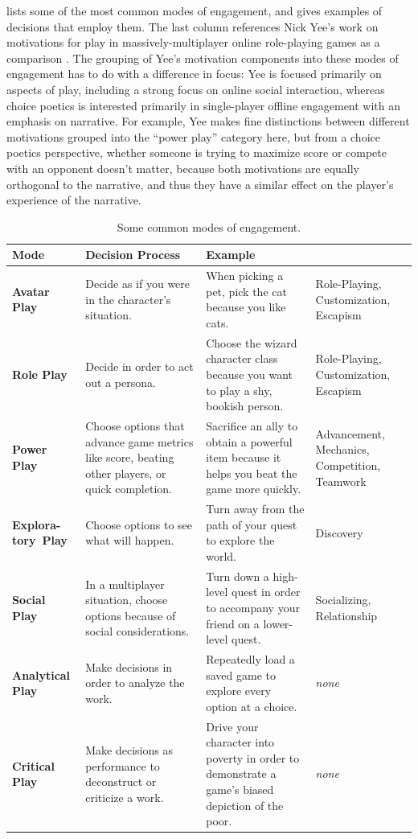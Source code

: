  lists some of the most common modes of engagement, and gives examples of decisions that employ them.
%
The last column references Nick Yee's work on motivations for play in massively-multiplayer online role-playing games as a comparison \citep{Yee2006}.
%
The grouping of Yee's motivation components into these modes of engagement has to do with a difference in focus: Yee is focused primarily on aspects of play, including a strong focus on online social interaction, whereas choice poetics is interested primarily in single-player offline engagement with an emphasis on narrative.
%
For example, Yee makes fine distinctions between different motivations grouped into the ``power play'' category here, but from a choice poetics perspective, whether someone is trying to maximize score or compete with an opponent doesn't matter, because both motivations are equally orthogonal to the narrative, and thus they have a similar effect on the player's experience of the narrative.


\begin{table}[!p]
\begingroup
\renewcommand*{\arraystretch}{1.5}
\begin{tabular}{>{\raggedright}p{5.5em}>{\raggedright}p{10em}>{\raggedright}p{9.8em}>{\raggedright}p{6.6em}}
\toprule
\textbf{Mode} & \textbf{Decision Process} & \textbf{Example} & \textbf{\citep{Yee2006}} \tabularnewline
\midrule
\textbf{Avatar Play}%
& Decide as if you were in the character's situation.%
& When picking a pet, pick the cat because you like cats.%
& Role-Playing, Customization, Escapism \tabularnewline
\textbf{Role Play}
& Decide in order to act out a persona.
& Choose the wizard character class because you want to play a shy, bookish person.
& Role-Playing, Customization, Escapism \tabularnewline
\textbf{Power Play}
& Choose options that advance game metrics like score, beating other players, or quick completion.
& Sacrifice an ally to obtain a powerful item because it helps you beat the game more quickly.
& Advancement, Mechanics, Competition, Teamwork \tabularnewline
\textbf{Explora-tory~Play}
& Choose options to see what will happen.
& Turn away from the path of your quest to explore the world.
& Discovery \tabularnewline
\textbf{Social Play}
& In a multiplayer situation, choose options because of social considerations.
& Turn down a high-level quest in order to accompany your friend on a lower-level quest.
& Socializing, \newline Relationship \tabularnewline
\textbf{Analytical Play}
& Make decisions in order to analyze the work.
& Repeatedly load a saved game to explore every option at a choice.
& \emph{none} \tabularnewline
\textbf{Critical Play}
& Make decisions as performance to deconstruct or criticize a work.
& Drive your character into poverty in order to demonstrate a game's biased depiction of the poor.
& \emph{none} \tabularnewline
\bottomrule
\end{tabular}
\endgroup
\caption[Modes of engagement]{Some common modes of engagement.}
\label{tab:modes-of-engagement}
\end{table}

